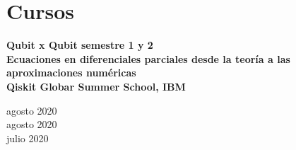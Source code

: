 \documentclass[a3paper]{adcv_color}
\begin{document}
\section{Cursos}

\begin{minipage}{0.85\linewidth}
  \textbf{Qubit x Qubit semestre 1 y 2}\\
  \textbf{Ecuaciones en diferenciales parciales desde la teoría a las aproximaciones numéricas}\\
  \textbf{Qiskit Globar Summer School, IBM}
\end{minipage}
\begin{minipage}{0.15\linewidth}
  \begin{flushright}
    agosto 2020\\
    agosto 2020\\
    julio 2020
  \end{flushright}
\end{minipage}\\
\end{document}
